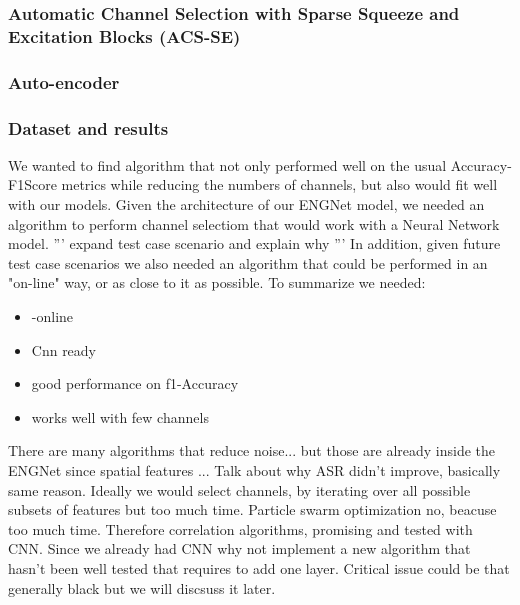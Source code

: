 \documentclass{Configuration_Files/PoliMi3i_thesis}
\begin{document}


\subsubsection{Automatic Channel Selection with Sparse Squeeze and Excitation Blocks (ACS-SE)}


\subsubsection{Auto-encoder}


\subsubsection{Dataset and results}


We wanted to find algorithm that not only performed well on the usual Accuracy-F1Score metrics while reducing the numbers of channels, but also would fit well with our models.
Given the architecture of our ENGNet model, we needed an algorithm to perform channel selectiom that would work with a Neural Network model.
''' expand test case scenario and explain why '''
In addition, given future test case scenarios we also needed an algorithm that could be performed in an "on-line" way, or as close to it as possible.
To summarize we needed:
\begin{itemize}
	\item-online
	\item Cnn ready
	\item good performance on f1-Accuracy
	\item works well with few channels
\end{itemize}

There are many algorithms that reduce noise...  \cite{abdullahEEGChannelSelection2022}
but those are already inside the ENGNet since spatial features ...
Talk about why ASR didn't improve, basically same reason.
Ideally we would select channels, by iterating over all possible subsets of features but too much time.
Particle swarm optimization no, beacuse too much time.
Therefore correlation algorithms, promising and tested with CNN.
Since we already had CNN why not implement a new algorithm that hasn't been well tested that requires to add one layer.
Critical issue could be that generally black but we will discsuss it later.
\end{document}
